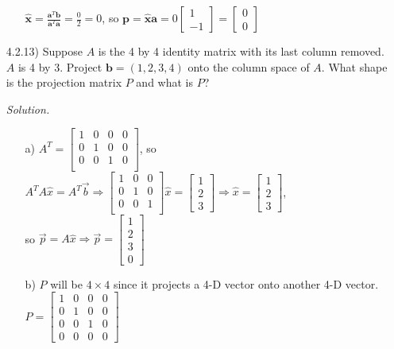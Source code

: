 \documentclass[12pt]{article}
\begin{document}
\begin{itemize}
\begin{itemize}
		  $\hat{\mathbf{x}}=\frac{\mathbf{a}^T\mathbf{b}}{\mathbf{a}^T\mathbf{a}}=\frac{0}{2}=0$, so 
	      $\mathbf{p}=\hat{\mathbf{x}}\mathbf{a}=0\left[\begin{array}{r} 1 \\ -1 \end{array}\right]=
          \left[\begin{array}{r} 0 \\ 0 \end{array}\right]$
\end{itemize}

\item[4.2.13)] Suppose $A$ is the 4 by 4 identity matrix with its last column removed. $A$ is 4 by 3. Project $\mathbf{b}=(1,2,3,4)$ onto the column space of $A$. What shape is the projection matrix $P$ and what is $P$?

\textit{Solution.}
\begin{itemize}
\item[a)] $A^T=
	      \left[\begin{array}{cccc} 
	      1 & 0 & 0 & 0\\
	      0 & 1 & 0 & 0\\
	      0 & 0 & 1 & 0\\
	     \end{array}\right]$, so $A^TA\hat{x}=A^T\vec{b} \Rightarrow 
         \left[\begin{array}{ccc} 
	      1 & 0 & 0 \\
	      0 & 1 & 0 \\
	      0 & 0 & 1 \\
	     \end{array}\right]\hat{x}=
         \left[\begin{array}{c} 1 \\ 2 \\ 3\end{array}\right] 
         \Rightarrow \hat{x}=\left[\begin{array}{c} 1 \\ 2 \\ 3\end{array}\right]$, \\
         so $\vec{p}=A\hat{x} \Rightarrow \vec{p}=\left[\begin{array}{c} 1 \\ 2 \\ 3\\ 0\end{array}\right]$
\item[b)] $P$ will be $4 \times 4$ since it projects a 4-D vector onto another 4-D vector. 
	      $P=\left[\begin{array}{cccc} 
	      1 & 0 & 0 & 0\\
	      0 & 1 & 0 & 0\\
	      0 & 0 & 1 & 0\\
          0 & 0 & 0 & 0
	     \end{array}\right]$
\end{itemize}


\end{itemize}
\end{document}
